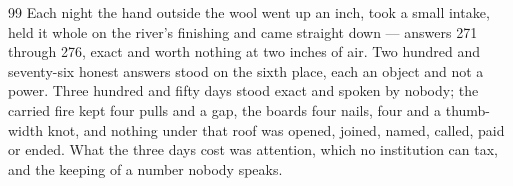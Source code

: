 \begin{CRchronicle}{99}
Each night the hand outside the wool went up an inch, took a small intake, held it whole on the river’s finishing and came straight down — answers 271 through 276, exact and worth nothing at two inches of air. Two hundred and seventy-six honest answers stood on the sixth place, each an object and not a power. Three hundred and fifty days stood exact and spoken by nobody; the carried fire kept four pulls and a gap, the boards four nails, four and a thumb-width knot, and nothing under that roof was opened, joined, named, called, paid or ended. What the three days cost was attention, which no institution can tax, and the keeping of a number nobody speaks.
\end{CRchronicle}
